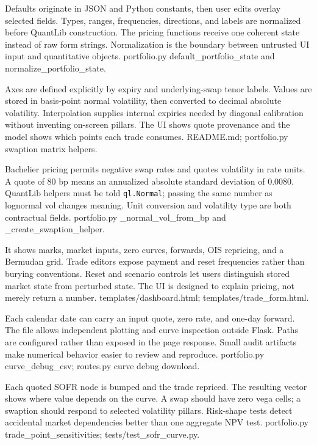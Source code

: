 {Defaults originate in JSON and Python constants, then user edits overlay selected fields.}
{Types, ranges, frequencies, directions, and labels are normalized before QuantLib construction.}
{The pricing functions receive one coherent state instead of raw form strings.}
{Normalization is the boundary between untrusted UI input and quantitative objects.}
{portfolio.py default\_portfolio\_state and normalize\_portfolio\_state.}

{Axes are defined explicitly by expiry and underlying-swap tenor labels.}
{Values are stored in basis-point normal volatility, then converted to decimal absolute volatility.}
{Interpolation supplies internal expiries needed by diagonal calibration without inventing on-screen pillars.}
{The UI shows quote provenance and the model shows which points each trade consumes.}
{README.md; portfolio.py swaption matrix helpers.}

{Bachelier pricing permits negative swap rates and quotes volatility in rate units.}
{A quote of 80 bp means an annualized absolute standard deviation of 0.0080.}
{QuantLib helpers must be told \texttt{ql.Normal}; passing the same number as lognormal vol changes meaning.}
{Unit conversion and volatility type are both contractual fields.}
{portfolio.py \_normal\_vol\_from\_bp and \_create\_swaption\_helper.}

{It shows marks, market inputs, zero curves, forwards, OIS repricing, and a Bermudan grid.}
{Trade editors expose payment and reset frequencies rather than burying conventions.}
{Reset and scenario controls let users distinguish stored market state from perturbed state.}
{The UI is designed to explain pricing, not merely return a number.}
{templates/dashboard.html; templates/trade\_form.html.}

{Each calendar date can carry an input quote, zero rate, and one-day forward.}
{The file allows independent plotting and curve inspection outside Flask.}
{Paths are configured rather than exposed in the page response.}
{Small audit artifacts make numerical behavior easier to review and reproduce.}
{portfolio.py curve\_debug\_csv; routes.py curve debug download.}

{Each quoted SOFR node is bumped and the trade repriced.}
{The resulting vector shows where value depends on the curve.}
{A swap should have zero vega cells; a swaption should respond to selected volatility pillars.}
{Risk-shape tests detect accidental market dependencies better than one aggregate NPV test.}
{portfolio.py trade\_point\_sensitivities; tests/test\_sofr\_curve.py.}

